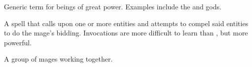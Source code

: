 \begin{gloss}
  
  
  
  
  
  
  
  
  \begin{comment}
  \paragraph{god}
  \end{comment}
  Generic term for  beings of great power. 
  Examples include the  and  gods. 
  
  
  
  \begin{comment}
  \subsubsection{H-N}
  \end{comment}
  
  
  
  
  
  
  
  \begin{comment}
  \paragraph{invocation}
  \end{comment}
  A spell that calls upon one or more entities and attempts to compel said entities to do the mage's bidding. 
  Invocations are more difficult to learn than , but more powerful. 
  
  
  
  
  
  
  \begin{comment}
  \paragraph{\ishrah}
  \end{comment}
  \gitem[\ishroth]{\ishrah}
  A group of mages working together. 
  
  
  
  

\end{gloss}
